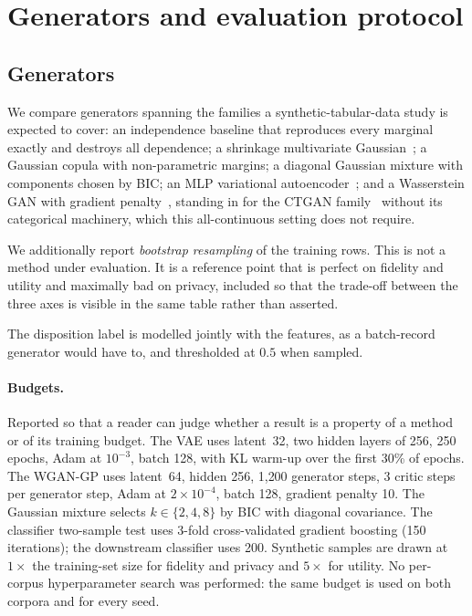 \documentclass[11pt]{article}
\begin{document}
\section{Generators and evaluation protocol}
\label{sec:protocol}

\subsection{Generators}
We compare \nMethods{} generators spanning the families a synthetic-tabular-data
study is expected to cover: an independence baseline that reproduces every
marginal exactly and destroys all dependence; a shrinkage multivariate
Gaussian~\citep{ledoit2004wellconditioned}; a Gaussian copula with
non-parametric margins; a diagonal Gaussian mixture with components chosen by
BIC; an MLP variational autoencoder~\citep{kingma2014autoencoding}; and a
Wasserstein GAN with gradient penalty~\citep{gulrajani2017improved}, standing in
for the CTGAN family~\citep{xu2019modeling} without its categorical machinery,
which this all-continuous setting does not require.

We additionally report \emph{bootstrap resampling} of the training rows. This is
not a method under evaluation. It is a reference point that is perfect on
fidelity and utility and maximally bad on privacy, included so that the trade-off
between the three axes is visible in the same table rather than asserted.

The disposition label is modelled jointly with the features, as a batch-record
generator would have to, and thresholded at $0.5$ when sampled.

\paragraph{Budgets.} Reported so that a reader can judge whether a result is a
property of a method or of its training budget. The VAE uses latent~32, two
hidden layers of 256, 250 epochs, Adam at $10^{-3}$, batch 128, with KL warm-up
over the first 30\% of epochs. The WGAN-GP uses latent~64, hidden 256, 1{,}200
generator steps, 3 critic steps per generator step, Adam at $2\times10^{-4}$,
batch 128, gradient penalty 10. The Gaussian mixture selects $k \in \{2,4,8\}$ by
BIC with diagonal covariance. The classifier two-sample test uses 3-fold
cross-validated gradient boosting (150 iterations); the downstream classifier
uses 200. Synthetic samples are drawn at $1\times$ the training-set size for
fidelity and privacy and $5\times$ for utility. No per-corpus hyperparameter
search was performed: the same budget is used on both corpora and for every
seed.
\end{document}
